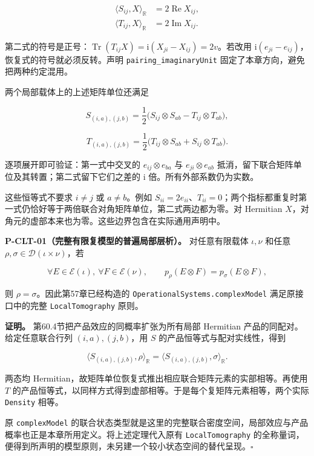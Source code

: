 \documentclass[
  11pt,
  oneside]{book}
\begin{document}
\[
\begin{aligned}
\langle S_{ij},X\rangle_{\mathbb R}
&=2\operatorname{Re}X_{ij},\\
\langle T_{ij},X\rangle_{\mathbb R}
&=2\operatorname{Im}X_{ij}.
\end{aligned}
\]

第二式的符号是正号：\(\operatorname{Tr}(T_{ij}X)=\mathrm i(X_{ji}-X_{ij})=2v\)。若改用
\(\mathrm i(e_{ji}-e_{ij})\)，恢复式的符号就必须反转。声明
\texttt{pairing\_\allowbreak imaginaryUnit} 固定了本章方向，避免把两种约定混用。

两个局部载体上的上述矩阵单位还满足

\[
S_{(i,a),(j,b)}
=\frac12\bigl(S_{ij}\otimes S_{ab}
-T_{ij}\otimes T_{ab}\bigr),
\]

\[
T_{(i,a),(j,b)}
=\frac12\bigl(T_{ij}\otimes S_{ab}
+S_{ij}\otimes T_{ab}\bigr).
\]

逐项展开即可验证：第一式中交叉的 \(e_{ij}\otimes e_{ba}\) 与
\(e_{ji}\otimes e_{ab}\)
抵消，留下联合矩阵单位及其转置；第二式留下它们之差的 \(\mathrm i\)
倍。所有外部系数仍为实数。

这些恒等式不要求 \(i\ne j\) 或 \(a\ne b\)。例如
\(S_{ii}=2e_{ii}\)、\(T_{ii}=0\)；两个指标都重复时第一式仍恰好等于两倍联合对角矩阵单位，第二式两边都为零。对
Hermitian \(X\)，对角元的虚部本来也为零。这些边界包含在实际通用声明中。

\protect\hypertarget{p-clt-01}{}{}

\textbf{P-CLT-01（完整有限复模型的普遍局部层析）。} 对任意有限载体
\(\iota,\nu\) 和任意 \(\rho,\sigma\in\mathcal D(\iota\times\nu)\)，若

\[
\forall E\in\mathcal E(\iota),\ 
\forall F\in\mathcal E(\nu),\qquad
p_\rho(E\otimes F)=p_\sigma(E\otimes F),
\]

则 \(\rho=\sigma\)。因此第57章已经构造的
\texttt{OperationalSystems.complexModel} 满足原接口中的完整
\texttt{LocalTomography} 原则。

\textbf{证明。} 第60.4节把产品效应的同概率扩张为所有局部 Hermitian
产品的同配对。给定任意联合行列 \((i,a),(j,b)\)，用 \(S\)
的产品恒等式与配对实线性，得到

\[
\langle S_{(i,a),(j,b)},\rho\rangle_{\mathbb R}
=\langle S_{(i,a),(j,b)},\sigma\rangle_{\mathbb R}.
\]

两态均 Hermitian，故矩阵单位恢复式推出相应联合矩阵元素的实部相等。再使用
\(T\)
的产品恒等式，以同样方式得到虚部相等。于是每个复矩阵元素相等，两个实际
\texttt{Density} 相等。

原 \texttt{complexModel}
的联合状态类型就是这里的完整联合密度空间，局部效应与产品概率也正是本章所用定义。将上述定理代入原有
\texttt{LocalTomography}
的全称量词，便得到所声明的模型原则，未另建一个较小状态空间的替代呈现。\(\square\)
\end{document}

